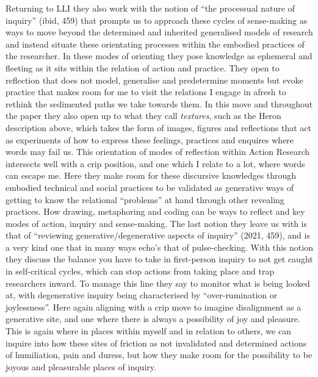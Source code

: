 Returning to LLI they also work with the notion of ``the processual
nature of inquiry'' (ibid, 459) that prompts us to approach these cycles
of sense-making as ways to move beyond the determined and inherited
generalised models of research and instead situate these orientating
processes within the embodied practices of the researcher. In these
modes of orienting they pose knowledge as ephemeral and fleeting as it
sits within the relation of action and practice. They open to reflection
that does not model, generalise and predetermine moments but evoke
practice that makes room for me to visit the relations I engage in
afresh to rethink the sedimented paths we take towards them. In this
move and throughout the paper they also open up to what they call
\emph{textures}, such as the Heron description above, which takes the
form of images, figures and reflections that act as experiments of how
to express these feelings, practices and enquires where words may fail
us. This orientation of modes of reflection within Action Research
intersects well with a crip position, and one which I relate to a lot,
where words can escape me. Here they make room for these discursive
knowledges through embodied technical and social practices to be
validated as generative ways of getting to know the relational
``problems'' at hand through other revealing practices. How drawing,
metaphoring and coding can be ways to reflect and key modes of action,
inquiry and sense-making. The last notion they leave us with is that of
``reviewing generative/degenerative aspects of inquiry'' (2021, 459),
and is a very kind one that in many ways echo's that of pulse-checking.
With this notion they discuss the balance you have to take in
first-person inquiry to not get caught in self-critical cycles, which
can stop actions from taking place and trap researchers inward. To
manage this line they say to monitor what is being looked at, with
degenerative inquiry being characterised by ``over-rumination or
joylessness''. Here again aligning with a crip move to imagine
disalignment as a generative site, and one where there is always a
possibility of joy and pleasure. This is again where in places within
myself and in relation to others, we can inquire into how these sites of
friction as not invalidated and determined actions of humiliation, pain
and duress, but how they make room for the possibility to be joyous and
pleasurable places of inquiry.


